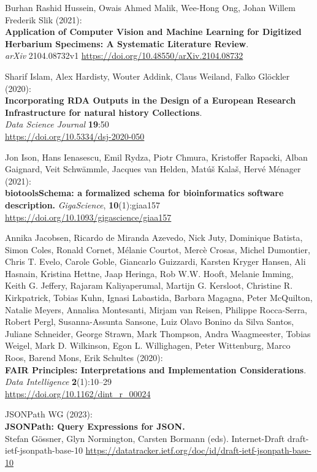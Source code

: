 \begin{thebibliography}{9}
Burhan Rashid Hussein, Owais Ahmed Malik, Wee-Hong Ong, Johan Willem Frederik Slik (2021):\\
\textbf{Application of Computer Vision and Machine Learning for Digitized
Herbarium Specimens: A Systematic Literature Review}.\\
\emph{arXiv} 2104.08732v1
\url{https://doi.org/10.48550/arXiv.2104.08732}

Sharif Islam, Alex Hardisty, Wouter Addink, Claus Weiland, Falko Glöckler
(2020):\\
\textbf{Incorporating RDA Outputs in the Design of a European Research Infrastructure for natural history Collections}.\\
\emph{Data Science Journal} \textbf{19}:50\\
\url{https://doi.org/10.5334/dsj-2020-050}

Jon Ison, Hans Ienasescu, Emil Rydza, Piotr Chmura, Kristoffer
Rapacki, Alban Gaignard, Veit Schwämmle, Jacques van Helden, Matúš
Kalaš, Hervé Ménager (2021):\\
\textbf{biotoolsSchema: a formalized schema for bioinformatics software
description.} \emph{GigaScience}, \textbf{10}(1):giaa157\\
\url{https://doi.org/10.1093/gigascience/giaa157}

Annika Jacobsen, Ricardo de Miranda Azevedo, Nick Juty, Dominique Batista, Simon Coles, Ronald Cornet, Mélanie Courtot, Mercè Crosas, Michel Dumontier, Chris T. Evelo, Carole Goble, Giancarlo Guizzardi, Karsten Kryger Hansen, Ali Hasnain, Kristina Hettne, Jaap Heringa, Rob W.W. Hooft, Melanie Imming, Keith G. Jeffery, Rajaram Kaliyaperumal, Martijn G. Kersloot, Christine R. Kirkpatrick, Tobias Kuhn, Ignasi Labastida, Barbara Magagna, Peter McQuilton, Natalie Meyers, Annalisa Montesanti, Mirjam van Reisen, Philippe Rocca-Serra, Robert Pergl, Susanna-Assunta Sansone, Luiz Olavo Bonino da Silva Santos, Juliane Schneider, George Strawn, Mark Thompson, Andra Waagmeester, Tobias Weigel, Mark D. Wilkinson, Egon L. Willighagen, Peter Wittenburg, Marco Roos, Barend Mons, Erik Schultes (2020):\\
\textbf{FAIR Principles: Interpretations and Implementation
Considerations}.\\
\emph{Data Intelligence} \textbf{2}(1):10--29\\
\url{https://doi.org/10.1162/dint_r_00024}

JSONPath WG (2023):\\
\textbf{JSONPath: Query Expressions for JSON.}\\
Stefan Gössner, Glyn Normington, Carsten Bormann (eds).
Internet-Draft draft-ietf-jsonpath-base-10
\url{https://datatracker.ietf.org/doc/id/draft-ietf-jsonpath-base-10}



\end{thebibliography}
